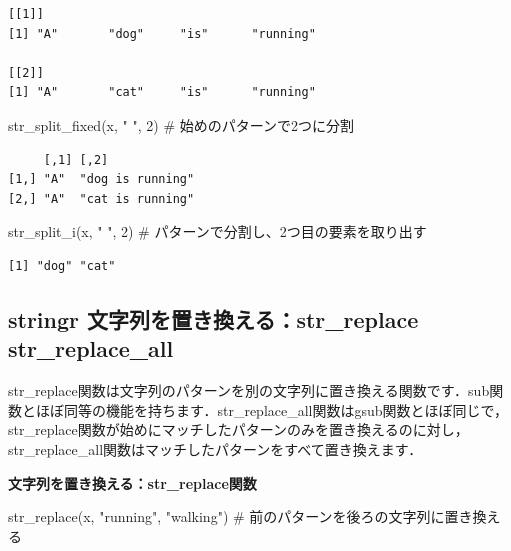\documentclass[
  letterpaper,
  DIV=11,
  numbers=noendperiod]{scrreprt}
\newenvironment{Shaded}{\begin{snugshade}}{\end{snugshade}}
\newcommand{\CommentTok}[1]{\textcolor[rgb]{0.37,0.37,0.37}{#1}}
\newcommand{\DecValTok}[1]{\textcolor[rgb]{0.68,0.00,0.00}{#1}}
\newcommand{\FunctionTok}[1]{\textcolor[rgb]{0.28,0.35,0.67}{#1}}
\newcommand{\NormalTok}[1]{\textcolor[rgb]{0.00,0.23,0.31}{#1}}
\newcommand{\StringTok}[1]{\textcolor[rgb]{0.13,0.47,0.30}{#1}}
\begin{document}
\begin{verbatim}
[[1]]
[1] "A"       "dog"     "is"      "running"

[[2]]
[1] "A"       "cat"     "is"      "running"
\end{verbatim}

\begin{Shaded}
\begin{Highlighting}[]
\FunctionTok{str\_split\_fixed}\NormalTok{(x, }\StringTok{" "}\NormalTok{, }\DecValTok{2}\NormalTok{) }\CommentTok{\# 始めのパターンで2つに分割}
\end{Highlighting}
\end{Shaded}

\begin{verbatim}
     [,1] [,2]            
[1,] "A"  "dog is running"
[2,] "A"  "cat is running"
\end{verbatim}

\begin{Shaded}
\begin{Highlighting}[]
\FunctionTok{str\_split\_i}\NormalTok{(x, }\StringTok{" "}\NormalTok{, }\DecValTok{2}\NormalTok{) }\CommentTok{\# パターンで分割し、2つ目の要素を取り出す}
\end{Highlighting}
\end{Shaded}

\begin{verbatim}
[1] "dog" "cat"
\end{verbatim}

\hypertarget{stringr-ux6587ux5b57ux5217ux3092ux7f6eux304dux63dbux3048ux308bstr_replace-str_replace_all}{%
\subsection{stringr 文字列を置き換える：str\_replace
str\_replace\_all}\label{stringr-ux6587ux5b57ux5217ux3092ux7f6eux304dux63dbux3048ux308bstr_replace-str_replace_all}}

str\_replace関数は文字列のパターンを別の文字列に置き換える関数です．sub関数とほぼ同等の機能を持ちます．str\_replace\_all関数はgsub関数とほぼ同じで，str\_replace関数が始めにマッチしたパターンのみを置き換えるのに対し，str\_replace\_all関数はマッチしたパターンをすべて置き換えます．

\textbf{文字列を置き換える：str\_replace関数}

\begin{Shaded}
\begin{Highlighting}[]
\FunctionTok{str\_replace}\NormalTok{(x, }\StringTok{"running"}\NormalTok{, }\StringTok{"walking"}\NormalTok{) }\CommentTok{\# 前のパターンを後ろの文字列に置き換える}
\end{Highlighting}
\end{Shaded}
\end{document}
